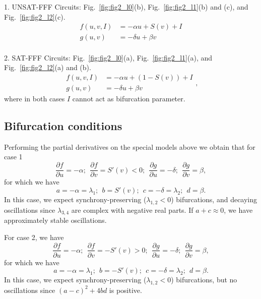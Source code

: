 \documentclass[12pt]{article}
\begin{document}
1. UNSAT-FFF Circuits: Fig.~\ref{fig:fig2_l0}(b), 
Fig.~\ref{fig:fig2_l1}(b) and (c), and 
Fig.~\ref{fig:fig2_l2}(c).
\begin{equation}
    \begin{aligned}
        f(u, v, I) &= -\alpha u + S(v) +  I\\
        g(u, v) &= -\delta u + \beta v
    \end{aligned}
\end{equation}
\\[0.2cm]

2. SAT-FFF Circuits: Fig.~\ref{fig:fig2_l0}(a), 
Fig.~\ref{fig:fig2_l1}(a), and 
Fig.~\ref{fig:fig2_l2}(a) and (b).
\begin{equation}
    \begin{aligned}
        f(u, v, I) &= -\alpha u + (1 - S(v)) +  I\\
        g(u, v) &= -\delta u + \beta v
    \end{aligned},
\end{equation}
where in both cases $I$ cannot act as bifurcation 
parameter.


\subsection{Bifurcation conditions}

Performing the partial derivatives on the special models
above we obtain that for case 1
\begin{equation}
    \dfrac{\partial f}{\partial u} = -\alpha; \ \
    \dfrac{\partial f}{\partial v} = S'(v) < 0; \ \ 
    \dfrac{\partial g}{\partial u} = -\delta; \ \
    \dfrac{\partial g}{\partial v} = \beta, 
\end{equation}
for which we have
\begin{equation}
    a = -\alpha = \lambda_1; \ \ 
    b = S'(v); \ \ 
    c = -\delta = \lambda_2; \ \ 
    d = \beta.
\end{equation}
In this case, we expect synchrony-preserving
($\lambda_{1,2} < 0$) 
bifurcations, and decaying oscillations since
$\lambda_{3,4}$ are complex with negative real parts. If $a + c \approx 0$,
we have approximately stable oscillations.

For case 2, we have
\begin{equation}
    \dfrac{\partial f}{\partial u} = -\alpha; \ \
    \dfrac{\partial f}{\partial v} = -S'(v) > 0; \ \ 
    \dfrac{\partial g}{\partial u} = -\delta; \ \
    \dfrac{\partial g}{\partial v} = \beta, 
\end{equation}
for which we have
\begin{equation}
    a = -\alpha = \lambda_1; \ \ 
    b = -S'(v); \ \ 
    c = -\delta = \lambda_2; \ \ 
    d = \beta.
\end{equation}
In this case, we expect synchrony-preserving
($\lambda_{1,2} < 0$) 
bifurcations, but no oscillations since 
$(a-c)^2 + 4bd$ is positive.
\end{document}
